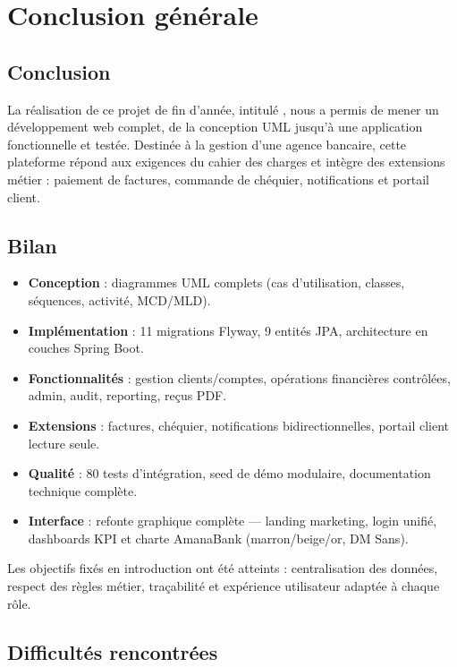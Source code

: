 \chapter*{Conclusion générale}

\section*{Conclusion}

La réalisation de ce projet de fin d'année, intitulé \textbf{\nomapplication}, nous a permis de mener un développement web complet, de la conception UML jusqu'à une application fonctionnelle et testée. Destinée à la gestion d'une agence bancaire, cette plateforme répond aux exigences du cahier des charges et intègre des extensions métier : paiement de factures, commande de chéquier, notifications et portail client.

\section*{Bilan}

\begin{itemize}[leftmargin=*]
    \item \textbf{Conception} : diagrammes UML complets (cas d'utilisation, classes, séquences, activité, MCD/MLD).
    \item \textbf{Implémentation} : 11 migrations Flyway, 9 entités JPA, architecture en couches Spring Boot.
    \item \textbf{Fonctionnalités} : gestion clients/comptes, opérations financières contrôlées, admin, audit, reporting, reçus PDF.
    \item \textbf{Extensions} : factures, chéquier, notifications bidirectionnelles, portail client lecture seule.
    \item \textbf{Qualité} : 80 tests d'intégration, seed de démo modulaire, documentation technique complète.
    \item \textbf{Interface} : refonte graphique complète — landing marketing, login unifié, dashboards KPI et charte AmanaBank (marron/beige/or, DM Sans).
\end{itemize}

Les objectifs fixés en introduction ont été atteints : centralisation des données, respect des règles métier, traçabilité et expérience utilisateur adaptée à chaque rôle.

\section*{Difficultés rencontrées}

